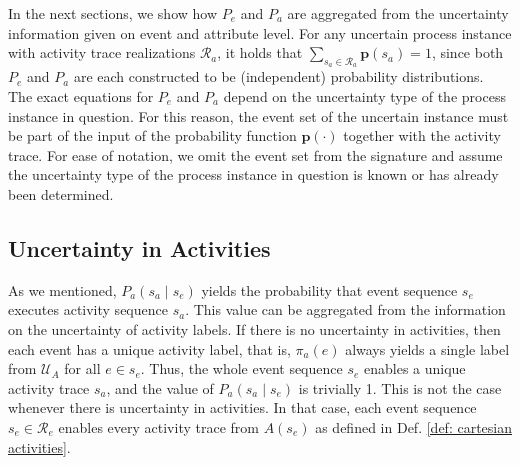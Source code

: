 In the next sections, we show how $P_e$ and $P_a$ are aggregated from the uncertainty information given on event and attribute level.
For any uncertain process instance with activity trace realizations $\mathcal{R}_a$, it holds that $\sum_{s_a \in \mathcal{R}_a} \textbf{p}(s_a) = 1$, since both $P_e$ and $P_a$ are each constructed to be (independent) probability distributions.
The exact equations for $P_e$ and $P_a$ depend on the uncertainty type of the process instance in question.
For this reason, the event set of the uncertain instance must be part of the input of the probability function $\textbf{p}(\cdot)$ together with the activity trace.
For ease of notation, we omit the event set from the signature and assume the uncertainty type of the process instance in question is known or has already been determined.


\subsection{Uncertainty in Activities}
As we mentioned, $P_a(s_a \mid s_e)$ yields the probability that event sequence $s_e$ executes activity sequence $s_a$.
This value can be aggregated from the information on the uncertainty of activity labels.
If there is no uncertainty in activities, then each event has a unique activity label, that is, $\pi_a(e)$ always yields a single label from $\mathcal{U}_A$ for all $e \in s_e$.
Thus, the whole event sequence $s_e$ enables a unique activity trace $s_a$, and the value of $P_a(s_a \mid s_e)$ is trivially 1.
This is not the case whenever there is uncertainty in activities.
In that case, each event sequence $s_e \in \mathcal{R}_e$ enables every activity trace from $A(s_e)$ as defined in Def. \ref{def: cartesian activities}.

